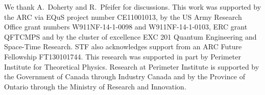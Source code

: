 \documentclass[aps, prl, letterpaper, twocolumn, superscriptaddress, notitlepage, 10pt]{revtex4-1}
\begin{document}
\acknowledgments 

We thank A.\ Doherty and R.\ Pfeifer for discussions. 
This work was supported by the ARC via EQuS project number CE11001013, by the US Army Research Office grant numbers W911NF-14-1-0098 and W911NF-14-1-0103, ERC grant QFTCMPS and by the cluster of excellence EXC 201 Quantum Engineering and Space-Time Research. STF also acknowledges support from an ARC Future Fellowship FT130101744. This research was supported in part by Perimeter Institute for Theoretical Physics. Research at Perimeter Institute is supported by the Government of Canada through Industry Canada and by the Province of Ontario through the Ministry of Research and Innovation.


\end{document}
